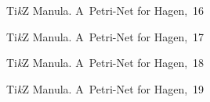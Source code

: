 \documentclass[a4paper,11pt]{article}
\begin{document}
\begin{figure}[ht]

  \centering

  \begin{tikzpicture}



  \end{tikzpicture}

  \caption{Ti\emph{k}Z Manula. A~Petri-Net for Hagen,~16}

\end{figure}





\begin{figure}[ht]

  \centering

  \begin{tikzpicture}



  \end{tikzpicture}

  \caption{Ti\emph{k}Z Manula. A~Petri-Net for Hagen,~17}

\end{figure}





\begin{figure}[ht]

  \centering

  \begin{tikzpicture}



  \end{tikzpicture}

  \caption{Ti\emph{k}Z Manula. A~Petri-Net for Hagen,~18}

\end{figure}





\begin{figure}[ht]

  \centering

  \begin{tikzpicture}



  \end{tikzpicture}

  \caption{Ti\emph{k}Z Manula. A~Petri-Net for Hagen,~19}

\end{figure}
\end{document}
